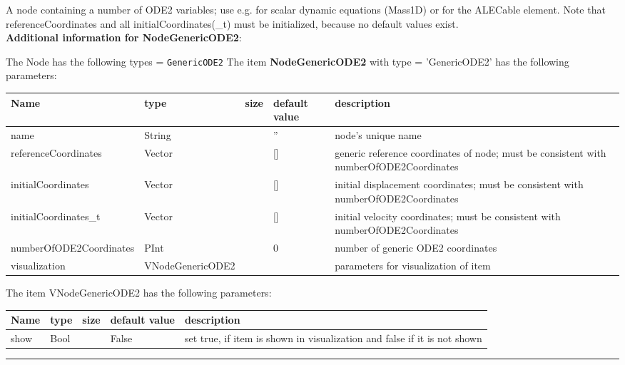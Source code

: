 \ei

%
\newpage

\label{sec:item:NodeGenericODE2}
A node containing a number of ODE2 variables; use e.g. for scalar dynamic equations (Mass1D) or for the ALECable element. Note that referenceCoordinates and all initialCoordinates(\_t) must be initialized, because no default values exist.\vspace{12pt}
 \\{\bf Additional information for NodeGenericODE2}:
\bi
  \item The Node has the following types = \texttt{GenericODE2}
\ei
\vspace{12pt} \noindent The item {\bf NodeGenericODE2} with type = 'GenericODE2' has the following parameters:\vspace{-1cm}\\ 
\begin{center}
  \footnotesize
  \begin{longtable}{| p{4.5cm} | p{2.5cm} | p{0.5cm} | p{2.5cm} | p{6cm} |}
    \hline
    \bf Name & \bf type & \bf size & \bf default value & \bf description \\ \hline
    name &     String &      &     '' &     node's unique name\\ \hline
    referenceCoordinates &     Vector &      &     [] &     generic reference coordinates of node; must be consistent with numberOfODE2Coordinates\\ \hline
    initialCoordinates &     Vector &      &     [] &     initial displacement coordinates; must be consistent with numberOfODE2Coordinates\\ \hline
    initialCoordinates\_t &     Vector &      &     [] &     initial velocity coordinates; must be consistent with numberOfODE2Coordinates\\ \hline
    numberOfODE2Coordinates &     PInt &      &     0 &     number of generic ODE2 coordinates\\ \hline
    visualization & VNodeGenericODE2 & & & parameters for visualization of item \\ \hline
	  \end{longtable}
	\end{center}
The item VNodeGenericODE2 has the following parameters:\vspace{-1cm}\\ 
\begin{center}
  \footnotesize
  \begin{longtable}{| p{4.5cm} | p{2.5cm} | p{0.5cm} | p{2.5cm} | p{6cm} |}
    \hline
    \bf Name & \bf type & \bf size & \bf default value & \bf description \\ \hline
    show &     Bool &      &     False &     set true, if item is shown in visualization and false if it is not shown\\ \hline
	  \end{longtable}
	\end{center}
\par\noindent\rule{\textwidth}{0.4pt}
\label{description_NodeGenericODE2}
